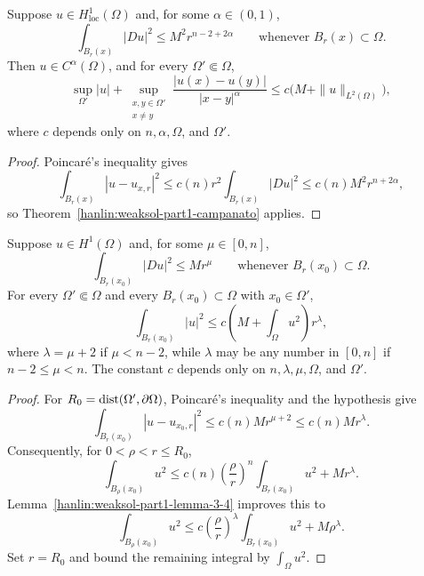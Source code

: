 \begin{corollary}\label{hanlin:weaksol-part1-morrey}
Suppose $u\in H^1_{\mathrm{loc}}(\Omega)$ and, for some
$\alpha\in(0,1)$,
\[
\int_{B_r(x)}|Du|^2\leq M^2r^{n-2+2\alpha}
\qquad\text{whenever }B_r(x)\subset\Omega.
\]
Then $u\in C^\alpha(\Omega)$, and for every $\Omega'\Subset\Omega$,
\[
\sup_{\Omega'}|u|+
\sup_{\substack{x,y\in\Omega'\\x\ne y}}
\frac{|u(x)-u(y)|}{|x-y|^\alpha}
\leq c\bigl(M+\|u\|_{L^2(\Omega)}\bigr),
\]
where $c$ depends only on $n,\alpha,\Omega$, and $\Omega'$.
\end{corollary}
\begin{proof}
\sketch Poincar\'e's inequality gives
\[
\int_{B_r(x)}|u-u_{x,r}|^2
\leq c(n)r^2\int_{B_r(x)}|Du|^2
\leq c(n)M^2r^{n+2\alpha},
\]
so Theorem~\ref{hanlin:weaksol-part1-campanato} applies.
\end{proof}

\begin{lemma}\label{hanlin:weaksol-part1-lemma-3-3}
Suppose $u\in H^1(\Omega)$ and, for some $\mu\in[0,n]$,
\[
\int_{B_r(x_0)}|Du|^2\leq Mr^\mu
\qquad\text{whenever }B_r(x_0)\subset\Omega.
\]
For every $\Omega'\Subset\Omega$ and every $B_r(x_0)\subset\Omega$ with
$x_0\in\Omega'$,
\[
\int_{B_r(x_0)}|u|^2
\leq c\left(M+\int_\Omega u^2\right)r^\lambda,
\]
where $\lambda=\mu+2$ if $\mu<n-2$, while $\lambda$ may be any number
in $[0,n]$ if $n-2\leq\mu<n$. The constant $c$ depends only on
$n,\lambda,\mu,\Omega$, and $\Omega'$.
\end{lemma}
\begin{proof}
\sketch For $R_0=\operatorname{dist}(\Omega',\partial\Omega)$, Poincar\'e's inequality
and the hypothesis give
\[
\int_{B_r(x_0)}|u-u_{x_0,r}|^2\leq c(n)Mr^{\mu+2}\leq c(n)Mr^\lambda.
\]
Consequently, for $0<\rho<r\leq R_0$,
\[
\int_{B_\rho(x_0)}u^2
\leq c(n)\left(\frac{\rho}{r}\right)^n
\int_{B_r(x_0)}u^2+Mr^\lambda.
\]
Lemma~\ref{hanlin:weaksol-part1-lemma-3-4} improves this to
\[
\int_{B_\rho(x_0)}u^2
\leq c\left(\frac{\rho}{r}\right)^\lambda
\int_{B_r(x_0)}u^2+M\rho^\lambda.
\]
Set $r=R_0$ and bound the remaining integral by $\int_\Omega u^2$.
\end{proof}

